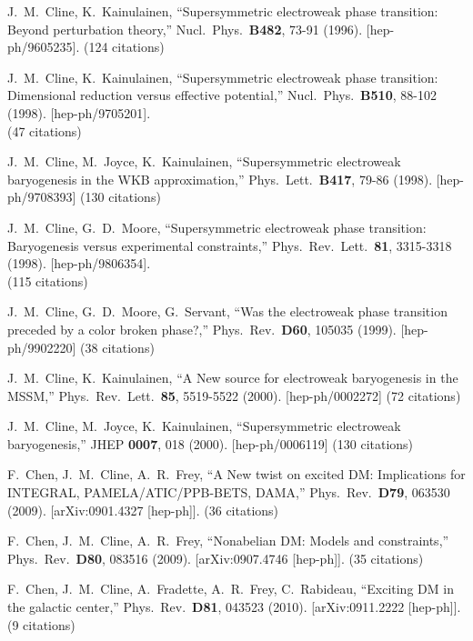 \documentclass[12pt]{article}
\begin{document}
\begin{thebibliography}{99}

  J.~M.~Cline, K.~Kainulainen,
  ``Supersymmetric electroweak phase transition: Beyond perturbation theory,''
  Nucl.\ Phys.\  {\bf B482}, 73-91 (1996).
  [hep-ph/9605235].  (124 citations)

  J.~M.~Cline, K.~Kainulainen,
  ``Supersymmetric electroweak phase transition: Dimensional reduction versus effective potential,''
  Nucl.\ Phys.\  {\bf B510}, 88-102 (1998).
  [hep-ph/9705201].\\ (47 citations)


  J.~M.~Cline, M.~Joyce, K.~Kainulainen,
  ``Supersymmetric electroweak baryogenesis in the WKB approximation,''
  Phys.\ Lett.\  {\bf B417}, 79-86 (1998).
  [hep-ph/9708393] (130 citations)

  J.~M.~Cline, G.~D.~Moore,
  ``Supersymmetric electroweak phase transition: Baryogenesis versus experimental constraints,''
  Phys.\ Rev.\ Lett.\  {\bf 81}, 3315-3318 (1998).
  [hep-ph/9806354].\\ (115 citations)

  J.~M.~Cline, G.~D.~Moore, G.~Servant,
  ``Was the electroweak phase transition preceded by a color broken phase?,''
  Phys.\ Rev.\  {\bf D60}, 105035 (1999).
  [hep-ph/9902220] (38 citations)

  J.~M.~Cline, K.~Kainulainen,
  ``A New source for electroweak baryogenesis in the MSSM,''
  Phys.\ Rev.\ Lett.\  {\bf 85}, 5519-5522 (2000).
  [hep-ph/0002272] (72 citations)

  J.~M.~Cline, M.~Joyce, K.~Kainulainen,
  ``Supersymmetric electroweak baryogenesis,''
  JHEP {\bf 0007}, 018 (2000).
  [hep-ph/0006119] (130 citations)


  F.~Chen, J.~M.~Cline, A.~R.~Frey,
  ``A New twist on excited DM: Implications for INTEGRAL, PAMELA/ATIC/PPB-BETS, DAMA,''
  Phys.\ Rev.\  {\bf D79}, 063530 (2009).
  [arXiv:0901.4327 [hep-ph]]. (36 citations)

  F.~Chen, J.~M.~Cline, A.~R.~Frey,
  ``Nonabelian DM: Models and constraints,''
  Phys.\ Rev.\  {\bf D80}, 083516 (2009).
  [arXiv:0907.4746 [hep-ph]]. (35 citations)

  F.~Chen, J.~M.~Cline, A.~Fradette, A.~R.~Frey, C.~Rabideau,
  ``Exciting DM in the galactic center,''
  Phys.\ Rev.\  {\bf D81}, 043523 (2010).
  [arXiv:0911.2222 [hep-ph]]. (9 citations)


\end{thebibliography}
\end{document}
